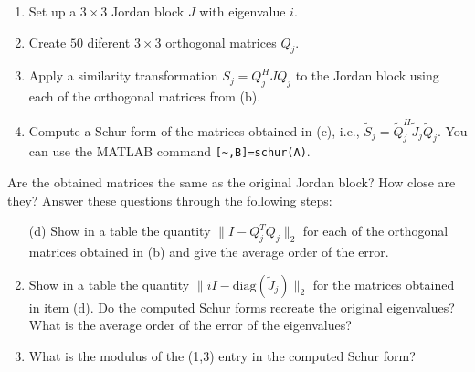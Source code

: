 \documentclass[14pt]{report}
\begin{document}
\begin{enumerate}
    \begin{enumerate}
      \item Set up a $3\times3$ Jordan block $J$ with eigenvalue $i$.
      \item Create $50$ diferent $3\times3$ orthogonal matrices $Q_j$.
      \item Apply a similarity transformation ${S}_j=Q^H_jJQ_j$ to the
        Jordan block using each of the orthogonal matrices from (b).
      \item Compute a Schur form of the matrices obtained in (c), i.e., $\tilde{S}_{j}=\tilde{Q}^H_j\tilde{J}_j\tilde{Q}_j$. You can use the MATLAB command \verb+[~,B]=schur(A)+.
\end{enumerate}

Are the obtained matrices the same as the original Jordan block? How
    close are they? Answer these questions through the following steps:
    \begin{enumerate}
        \item[(d)] Show in a table the quantity $\|I-Q_j^TQ_j\|_2$ for each of the orthogonal
          matrices obtained in (b) and give the average order of the error.
        \item Show in a table the quantity $\|iI-\text{diag}(\tilde{J}_j)\|_2$ for the matrices obtained in item (d). Do the computed Schur forms recreate the original eigenvalues? What is the average order of the error of the eigenvalues?
        \item What is the modulus of the (1,3) entry in the computed Schur form?
  \end{enumerate}

  \end{enumerate}
\end{document}
